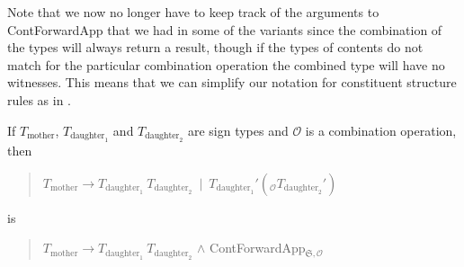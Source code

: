    
               
      


Note that we now no longer have to keep track of the arguments to
ContForwardApp that we had in some of the variants since the
combination of the types will always return a result, though if the
types of contents do not match for the particular combination
operation the combined type will have no witnesses.  This means that
we can simplify our notation for constituent structure rules as in
\nexteg{}.
\begin{ex} 
If $T_{\text{mother}}$, $T_{\text{daughter}_1}$ and
  $T_{\text{daughter}_2}$ are sign types and $\mathcal{O}$ is a
  combination operation, then
  \begin{quote}
    $T_{\text{mother}}\longrightarrow
    T_{\text{daughter}_1}\ T_{\text{daughter}_2}\ \mid\
    T_{\text{daughter}_1}'(_{\mathcal{O}}T_{\text{daughter}_2}')$
  \end{quote}
  is
  \begin{quote}
  $T_{\text{mother}}\longrightarrow
    T_{\text{daughter}_1}\ T_{\text{daughter}_2}$ \d{\d{$\wedge$}}
    ContForwardApp$_{\mathfrak{S},\mathcal{O}}$
  \end{quote}
  
\end{ex} 
  
  



